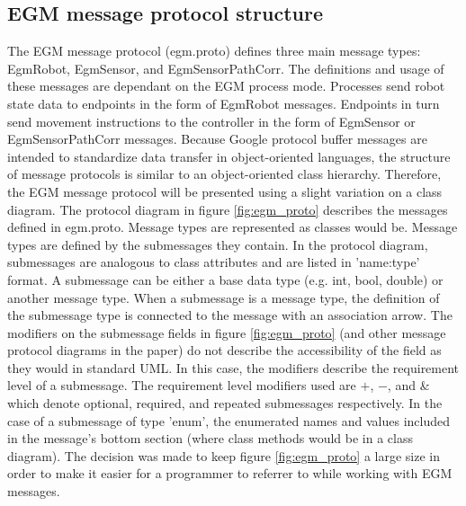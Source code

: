 \documentclass{cslthse-msc}
\begin{document}
\subsection{EGM message protocol structure}
\label{sec:EGM:Message_Protos:proto_struct}
The EGM message protocol (egm.proto) defines three main message types: EgmRobot, EgmSensor, and EgmSensorPathCorr. The definitions and usage of these messages are dependant on the EGM process mode. Processes send robot state data to endpoints in the form of EgmRobot messages. Endpoints in turn send movement instructions to the controller in the form of EgmSensor or EgmSensorPathCorr messages. Because Google protocol buffer messages are intended to standardize data transfer in object-oriented languages, the structure of message protocols is similar to an  object-oriented class hierarchy. Therefore, the EGM message protocol will be presented using a slight variation on a class diagram. The protocol diagram in figure \ref{fig:egm_proto} describes the messages defined in egm.proto. Message types are represented as classes would be. Message types are defined by the submessages they contain. In the protocol diagram, submessages are analogous to class attributes and are listed in 'name:type' format. A submessage can be either a base data type (e.g. int, bool, double) or another message type. When a submessage is a message type, the definition of the submessage type is connected to the message with an association arrow. The modifiers on the submessage fields in figure \ref{fig:egm_proto} (and other message protocol diagrams in the paper) do not describe the accessibility of the field as they would in standard UML. In this case, the modifiers describe the requirement level of a submessage. The requirement level modifiers used are $+$, $-$, and \& which denote optional, required, and repeated submessages respectively. In the case of a submessage of type 'enum', the enumerated names and values included in the message's bottom section (where class methods would be in a class diagram). The decision was made to keep figure \ref{fig:egm_proto} a large size in order to make it easier for a programmer to referrer to while working with EGM messages.
\end{document}
